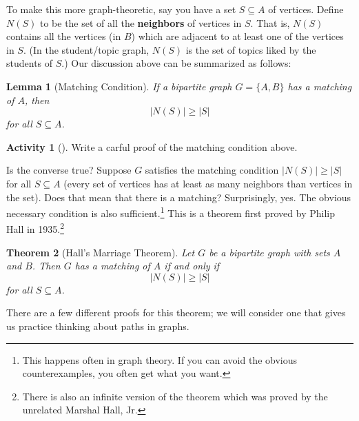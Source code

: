\documentclass[10pt,]{book}
\newcommand{\terminology}[1]{\textbf{#1}}
\theoremstyle{plain}
\newtheorem{theorem}{Theorem}[section]
\newtheorem{lemma}[theorem]{Lemma}
\theoremstyle{definition}
\theoremstyle{definition}
\theoremstyle{definition}
\newtheorem{activity}[project]{Activity}
\numberwithin{equation}{chapter}
\begin{document}
To make this more graph-theoretic, say you have a set \(S \subseteq A\) of vertices. Define \(N(S)\)\label{notation-8}
 to be the set of all the \terminology{neighbors} of vertices in \(S\). That is, \(N(S)\) contains all the vertices (in \(B\)) which are adjacent to at least one of the vertices in \(S\). (In the student/topic graph, \(N(S)\) is the set of topics liked by the students of \(S\).) Our discussion above can be summarized as follows:%
\begin{lemma}[{Matching Condition}]\label{lemma-1}
\hypertarget{p-441}{}%
 If a bipartite graph \(G = \{A, B\}\) has a matching of \(A\), then%
\begin{equation*}
|N(S)| \ge |S|
\end{equation*}
for all \(S \subseteq A\).%
\end{lemma}
\begin{activity}[]\label{activity-50}
\hypertarget{p-442}{}%
Write a carful proof of the matching condition above.%
\end{activity}
\hypertarget{p-443}{}%
Is the converse true? Suppose \(G\) satisfies the matching condition \(|N(S)| \ge |S|\) for all \(S \subseteq A\) (every set of vertices has at least as many neighbors than vertices in the set). Does that mean that there is a matching? Surprisingly, yes. The obvious necessary condition is also sufficient.\footnote{This happens often in graph theory.  If you can avoid the obvious counterexamples, you often get what you want.\label{fn-7}} This is a theorem first proved by Philip Hall in 1935.\footnote{There is also an infinite version of the theorem which was proved by the unrelated Marshal Hall, Jr.\label{fn-8}}%
\begin{theorem}[{Hall's Marriage Theorem}]\label{thm-hallmarriage}
\hypertarget{p-444}{}%
 Let \(G\) be a bipartite graph with sets \(A\) and \(B\). Then \(G\) has a matching of \(A\) if and only if%
\begin{equation*}
|N(S)| \ge |S|
\end{equation*}
for all \(S \subseteq A\).%
\end{theorem}
\hypertarget{p-445}{}%
There are a few different proofs for this theorem; we will consider one that gives us practice thinking about paths in graphs.%
\end{document}
